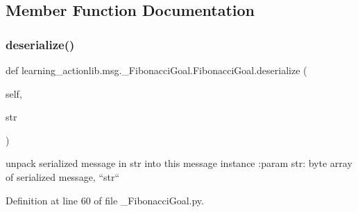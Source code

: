 \subsection{Member Function Documentation}
\mbox{\label{classlearning__actionlib_1_1msg_1_1__FibonacciGoal_1_1FibonacciGoal_aa6e46f39ee2f8fa0d0e072402304d9cd}} 
\subsubsection{\texorpdfstring{deserialize()}{deserialize()}}
{\footnotesize\ttfamily def learning\+\_\+actionlib.\+msg.\+\_\+\+Fibonacci\+Goal.\+Fibonacci\+Goal.\+deserialize (\begin{DoxyParamCaption}\item[{}]{self,  }\item[{}]{str }\end{DoxyParamCaption})}

\begin{DoxyVerb}unpack serialized message in str into this message instance
:param str: byte array of serialized message, ``str``
\end{DoxyVerb}
 

Definition at line 60 of file \+\_\+\+Fibonacci\+Goal.\+py.


